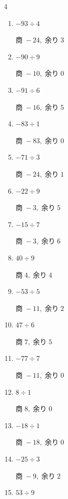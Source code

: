 \begin{multicols}{4}
\begin{enumerate}
        $商\; -20,\; 余り\; 0$

  \item $-93 \div 4$

        $商\; -24,\; 余り\; 3$

  \item $-90 \div 9$

        $商\; -10,\; 余り\; 0$

  \item $-91 \div 6$

        $商\; -16,\; 余り\; 5$

  \item $-83 \div 1$

        $商\; -83,\; 余り\; 0$

\columnbreak %

  \item $-71 \div 3$

        $商\; -24,\; 余り\; 1$

  \item $-22 \div 9$

        $商\; -3,\; 余り\; 5$

  \item $-15 \div 7$

        $商\; -3,\; 余り\; 6$

  \item $40 \div 9$

        $商\; 4,\; 余り\; 4$

  \item $-53 \div 5$

        $商\; -11,\; 余り\; 2$

  \item $47 \div 6$

        $商\; 7,\; 余り\; 5$

  \item $-77 \div 7$

        $商\; -11,\; 余り\; 0$

  \item $8 \div 1$

        $商\; 8,\; 余り\; 0$

  \item $-18 \div 1$

        $商\; -18,\; 余り\; 0$

  \item $-25 \div 3$

        $商\; -9,\; 余り\; 2$

  \item $53 \div 9$


\end{enumerate}
\end{multicols}
